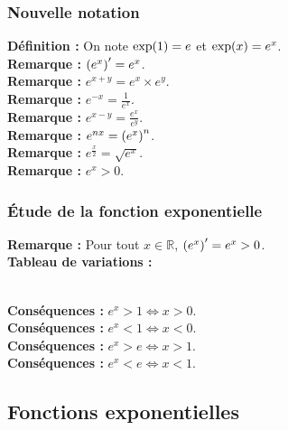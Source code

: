 \documentclass[a4paper,titlepage]{article}
\makeatletter
\let\oldleft\left
\renewcommand{\left}{\mathopen{}\mathclose\bgroup\oldleft}
\let\oldright\right
\renewcommand{\right}{\aftergroup\egroup\oldright}
\def\tikzscale{1}\begin{lrbox}{\measure@tikzpicture}
\edef\tikzscale{\pgfmathresult}
\makeatother
\begin{document}
        \subsubsection{Nouvelle notation}
            \textbf{Définition :} On note $\exp\left(1\right)=e$ et $\exp\left(x\right)=e^{x}$.
            \\
            \textbf{Remarque :} $\left(e^{x}\right)^{\prime}=e^{x}$.
            \\
            \textbf{Remarque :} $e^{x+y}=e^{x}\times e^{y}$.
            \\
            \textbf{Remarque :} $e^{-x}=\frac{1}{e^{x}}$.
            \\
            \textbf{Remarque :} $e^{x-y}=\frac{e^{x}}{e^{y}}$.
            \\
            \textbf{Remarque :} $e^{nx}=\left(e^{x}\right)^{n}$.
            \\
            \textbf{Remarque :} $e^{\frac{x}{2}}=\sqrt{e^{x}}$.
            \\
            \textbf{Remarque :} $e^{x}>0$.
    \subsubsection{Étude de la fonction exponentielle}
        \textbf{Remarque :} Pour tout $x\in\mathbb{R}$, $\left(e^{x}\right)^{\prime}=e^{x}>0$.
        \\
        \textbf{Tableau de variations :}
        \\
        \begin{scaletikzpicturetowidth}{\textwidth}
        \end{scaletikzpicturetowidth}
        \\
        \textbf{Conséquences :} $e^{x}>1\Leftrightarrow x>0$.
        \\
        \textbf{Conséquences :} $e^{x}<1\Leftrightarrow x<0$.
        \\
        \textbf{Conséquences :} $e^{x}>e\Leftrightarrow x>1$.
        \\
        \textbf{Conséquences :} $e^{x}<e\Leftrightarrow x<1$.
    \subsection{Fonctions exponentielles}
\end{document}
